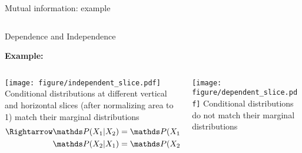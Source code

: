 \documentclass[11pt,compress,t,notes=noshow, aspectratio=169, xcolor=table]{beamer}
\begin{document}
\begin{frame}{Mutual information: example}
\begin{columns}[c, totalwidth=\textwidth]
\begin{column}{0.74\linewidth}
    \end{column}
\end{columns}



\end{frame}



\begin{frame}{Dependence and Independence}
	
\textbf{Example:}
\begin{columns}[T, totalwidth=\linewidth]
\begin{column}{0.49\linewidth}
\texttt{[image: figure/independent\_slice.pdf]}
Conditional distributions at different vertical and horizontal slices (after normalizing area to 1) match their marginal distributions
\begin{align*}
    \Rightarrow \P(X_1|X_2) &= \P(X_1) \hspace{2.5cm} \\ 
    \P(X_2|X_1) &= \P(X_2)
\end{align*}
\end{column}
\hfill\pause
\begin{column}{0.49\linewidth}
\texttt{[image: figure/dependent\_slice.pdf]}
Conditional distributions do not match their marginal distributions
\end{column}
\end{columns}


\end{frame}
\end{document}
